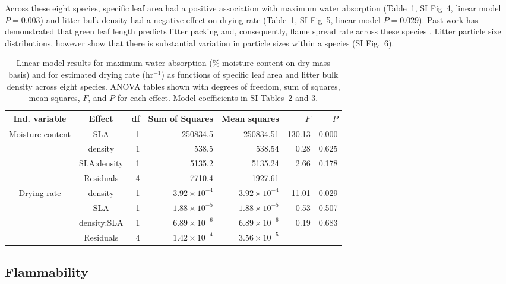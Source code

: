 \documentclass[letterpaper,12pt]{article}
\begin{document}
Across these eight species, specific leaf area had a positive association with
maximum water absorption (Table~\ref{tab:mc_di_anova}, SI Fig~4, linear model
$P = 0.003$) and litter bulk density had a negative effect on drying rate
(Table~\ref{tab:mc_di_anova}, SI Fig~5, linear model $P = 0.029$). Past work
has demonstrated that green leaf length predicts litter packing and,
consequently, flame spread rate across these species
\citep{Magalhaes+Schwilk-2012}. Litter particle size distributions, however
show that there is substantial variation in particle sizes within a species (SI
Fig.~6).

\begin{table}
  \caption{Linear model results for maximum water absorption (\% moisture
    content on dry mass basis) and for estimated drying rate (hr$^{-1}$) as
    functions of specific leaf area and litter bulk density across eight
    species. ANOVA tables shown with degrees of freedom, sum of squares, mean
    squares, $F$, and $P$ for each effect. Model coefficients in SI Tables~2 and 3.}
  \label{tab:mc_di_anova}
\centering
\begin{tabular}{ccrrrrr}
  \toprule
Ind. variable & Effect & df & Sum of Squares & Mean squares & $F$ & $P$ \\ 
  \midrule
Moisture content & SLA & 1 & 250834.5 & 250834.51 & 130.13 & 0.000 \\ 
                 & density & 1 & 538.5 & 538.54 & 0.28 & 0.625 \\ 
                 & SLA:density & 1 & 5135.2 & 5135.24 & 2.66 & 0.178 \\ 
                 & Residuals & 4 & 7710.4 & 1927.61 &  &  \\ 
  \midrule
Drying rate & density & 1 & $3.92 \times 10^{-4}$ & $3.92 \times 10^{-4}$ & 11.01 & 0.029 \\ 
            &  SLA & 1 & $1.88 \times 10^{-5}$ & $1.88 \times 10^{-5}$ & 0.53 & 0.507 \\ 
            &  density:SLA & 1 & $6.89 \times 10^{-6}$ & $6.89 \times 10^{-6}$ & 0.19 & 0.683 \\ 
            &  Residuals & 4 & $1.42 \times 10^{-4}$ & $3.56 \times 10^{-5}$ &  &  \\ 
  \bottomrule
\end{tabular}
\end{table}

\subsection*{Flammability}
\end{document}
